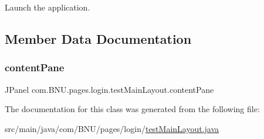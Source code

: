 Launch the application. 

\subsection{Member Data Documentation}
\mbox{\label{classcom_1_1_b_n_u_1_1pages_1_1login_1_1test_main_layout_a2283ec6ccc0fa50c00d51fef40fbf316}} 
\subsubsection{\texorpdfstring{content\+Pane}{contentPane}}
{\footnotesize\ttfamily J\+Panel com.\+B\+N\+U.\+pages.\+login.\+test\+Main\+Layout.\+content\+Pane\hspace{0.3cm}{\ttfamily [private]}}



The documentation for this class was generated from the following file\+:\begin{DoxyCompactItemize}
\item 
src/main/java/com/\+B\+N\+U/pages/login/\mbox{\hyperlink{test_main_layout_8java}{test\+Main\+Layout.\+java}}\end{DoxyCompactItemize}
